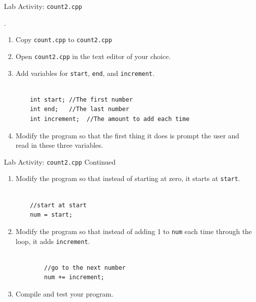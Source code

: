 \documentclass[xcolor=table]{beamer}
\begin{document}
\begin{frame}[fragile]{Lab Activity: \texttt{count2.cpp}}

  .
  \newline{}
  \begin{enumerate}[<+->]
    \item Copy \texttt{count.cpp} to \texttt{count2.cpp}
    \item Open \texttt{count2.cpp} in the text editor of your choice.
    \item Add variables for \texttt{start}, \texttt{end}, and \texttt{increment}.
    \begin{BVerbatim}

    int start; //The first number
    int end;   //The last number
    int increment;  //The amount to add each time
    \end{BVerbatim}
    \item Modify the program so that the first thing it does is prompt the user and read in these three variables.

  \end{enumerate}
\end{frame}


\begin{frame}[fragile]{Lab Activity: \texttt{count2.cpp} Continued}
  \begin{enumerate}[<+->][4]
    \item Modify the program so that instead of starting at zero, it starts at \texttt{start}.\newline
    \begin{BVerbatim}

    //start at start
    num = start;
    \end{BVerbatim}

    \item Modify the program so that instead of adding 1 to \texttt{num} each time through the loop, it adds \texttt{increment}.\newline
    \begin{BVerbatim}

        //go to the next number
        num += increment;
    \end{BVerbatim}

    \item Compile and test your program.
  \end{enumerate}
\end{frame}
\end{document}
